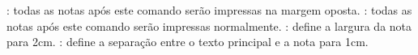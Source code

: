 \reversemarginpar: todas as notas após este comando serão impressas na margem oposta.
\normalmarginpar: todas as notas após este comando serão impressas normalmente.
\renewcommand{\marginparwidth}{1cm}: define a largura da nota para 2cm.
\renewcommand{\marginparsep}{1cm}: define a separação entre o texto principal e a nota para 1cm.